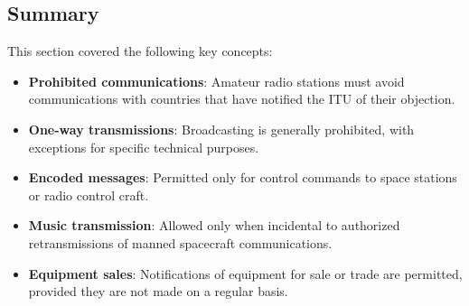 \subsection*{Summary}
This section covered the following key concepts:
\begin{itemize}
    \item \textbf{Prohibited communications}: Amateur radio stations must avoid communications with countries that have notified the ITU of their objection.
    \item \textbf{One-way transmissions}: Broadcasting is generally prohibited, with exceptions for specific technical purposes.
    \item \textbf{Encoded messages}: Permitted only for control commands to space stations or radio control craft.
    \item \textbf{Music transmission}: Allowed only when incidental to authorized retransmissions of manned spacecraft communications.
    \item \textbf{Equipment sales}: Notifications of equipment for sale or trade are permitted, provided they are not made on a regular basis.
\end{itemize}
